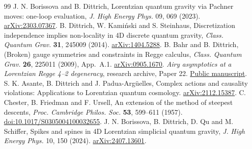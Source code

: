 \documentclass[11pt]{article}
\begin{document}
\begin{thebibliography}{99}
 J. N. Borissova and B. Dittrich, Lorentzian quantum gravity via Pachner moves: one-loop evaluation,
\emph{J. High Energy Phys.} 09, 069 (2023). \href{https://arxiv.org/abs/2303.07367}{arXiv:2303.07367}.
 B. Dittrich, W. Kami\'nski and S. Steinhaus, Discretization independence implies non-locality in 4D discrete quantum gravity,
\emph{Class. Quantum Grav.} \textbf{31}, 245009 (2014). \href{https://arxiv.org/abs/1404.5288}{arXiv:1404.5288}.
 B. Bahr and B. Dittrich, (Broken) gauge symmetries and constraints in Regge calculus,
\emph{Class. Quantum Grav.} \textbf{26}, 225011 (2009), App.~A.1. \href{https://arxiv.org/abs/0905.1670}{arXiv:0905.1670}.
 \emph{Airy asymptotics at a Lorentzian Regge 4--2 degeneracy}, research archive, Paper 22.
\href{https://github.com/g3173028019-beep/ai-automated-quantum-gravity-research/blob/main/papers/22-lorentzian-regge-airy/manuscript.md}{Public manuscript}.
 S. K. Asante, B. Dittrich and J. Padua-Arg\"uelles, Complex actions and causality violations: Applications to Lorentzian quantum cosmology.
\href{https://arxiv.org/abs/2112.15387}{arXiv:2112.15387}.
 C. Chester, B. Friedman and F. Ursell, An extension of the method of steepest descents,
\emph{Proc. Cambridge Philos. Soc.} \textbf{53}, 599--611 (1957).
\href{https://doi.org/10.1017/S0305004100032655}{doi:10.1017/S0305004100032655}.
 J. N. Borissova, B. Dittrich, D. Qu and M. Schiffer, Spikes and spines in 4D Lorentzian simplicial quantum gravity,
\emph{J. High Energy Phys.} 10, 150 (2024). \href{https://arxiv.org/abs/2407.13601}{arXiv:2407.13601}.
\end{thebibliography}
\end{document}

